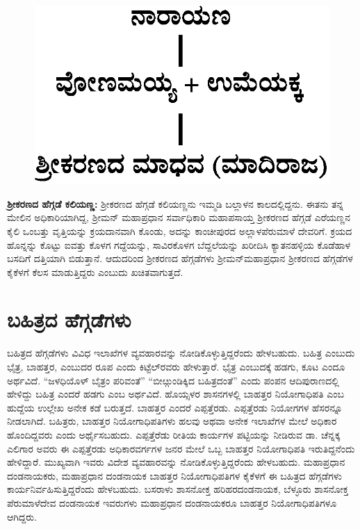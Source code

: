 \begin{figure}[H]
\includegraphics[scale=1.3]{images/chap3/chap3fig30.jpeg}
\end{figure}

\textbf{ಶ‍್ರೀಕರಣದ ಹೆಗ್ಗಡೆ ಕಲಿಯಣ್ಣ:} ಶ‍್ರೀಕರಣದ ಹೆಗ್ಗಡೆ ಕಲಿಯಣ್ಣನು ಇಮ್ಮಡಿ ಬಲ್ಲಾಳನ ಕಾಲದಲ್ಲಿದ್ದನು. ಈತನು ತನ್ನ ಮೇಲಿನ ಅಧಿಕಾರಿಯಾಗಿದ್ದ, ಶ‍್ರೀಮನ್​ ಮಹಾಪ್ರಧಾನ ಸರ್ವಾಧಿಕಾರಿ ಮಹಾಪಸಾಯ್ತ ಶ‍್ರೀಕರಣದ ಹೆಗ್ಗಡೆ ಎರೆಯಣ್ಣನ ಕೈಲಿ ಒಂಬತ್ತು ವೃತ್ತಿಯನ್ನು ಕ್ರಯದಾನವಾಗಿ ಕೊಂಡು, ಅದನ್ನು ಕಾಂಚೀಪುರದ ಅಲ್ಲಾಳಪೆರುಮಾಳೆ ದೇವರಿಗೆ. ಕ್ರಯದ ಹೊನ್ನನ್ನು ಕೊಟ್ಟು ಐವತ್ತು ಕೊಳಗ ಗದ್ದೆಯನ್ನು, ಸಾವಿರಕೊಳಗ ಬೆದ್ದಲೆಯನ್ನು ಖರೀದಿಸಿ ಕ್ಯಾತನಹಳ್ಳಿಯ ಕೊಡೆಹಾಳ ಬಸದಿಗೆ ದತ್ತಿಯಾಗಿ ಬಿಡುತ್ತಾನೆ. ಆದುದರಿಂದ ಶ‍್ರೀಕರಣದ ಹೆಗ್ಗಡೆಗಳು ಶ‍್ರೀಮನ್​ಮಹಾಪ್ರಧಾನ ಶ‍್ರೀಕರಣದ ಹೆಗ್ಗಡೆಗಳ ಕೈಕೆಳಗೆ ಕೆಲಸ ಮಾಡುತ್ತಿದ್ದರು ಎಂಬುದು ಖಚಿತವಾಗುತ್ತದೆ.


\section{ಬಹಿತ್ರದ ಹೆಗ್ಗಡೆಗಳು}

ಬಹಿತ್ರದ ಹೆಗ್ಗಡೆಗಳು ವಿವಿಧ ಇಲಾಖೆಗಳ ವ್ಯವಹಾರವನ್ನು ನೋಡಿಕೊಳ್ಳುತ್ತಿದ್ದರೆಂದು ಹೇಳಬಹುದು. ಬಹಿತ್ರ ಎಂಬುದು ಭೈತ್ರ, ಬಾಹತ್ತರ, ಎಂಬುದರ ರೂಪ ಎಂದು ಕಿಟ್ಟೆಲ್​ರವರು ಹೇಳುತ್ತಾರೆ. ಭೈತ್ರ ಎಂಬುದಕ್ಕೆ ಹಡಗು, ಕೂಟ ಎಂದೂ ಅರ್ಥವಿದೆ. “ಜಳಧಿಯೊಳ್​ ಬೈತ್ರಂ ಪರಿವಂತೆ” “ಬೀೞ್ಗುಂಡಿಕ್ಕಿದ ಬಹಿತ್ರದಂತೆ” ಎಂದು ಪಂಪನ ಆದಿಪುರಾಣದಲ್ಲಿ ಹೇಳಿದ್ದು ಬಹಿತ್ರ ಎಂದರೆ ಹಡಗು ಎಂಬ ಅರ್ಥವಿದೆ. ಹೊಯ್ಸಳರ ಶಾಸನಗಳಲ್ಲಿ ಬಾಹತ್ತರ ನಿಯೋಗಾಧಿಪತಿ ಎಂಬ ಹುದ್ದೆಯ ಉಲ್ಲೇಖ ಅನೇಕ ಕಡೆ ಬರುತ್ತದೆ. ಬಾಹತ್ತರ ಎಂದರೆ ಎಪ್ಪತ್ತೆರಡು. ಎಪ್ಪತ್ತೆರಡು ನಿಯೋಗಗಳ ಹೆಸರನ್ನೂ ನೀಡಲಾಗಿದೆ. ಬಹಿತ್ರರು, ಬಾಹತ್ತರ ನಿಯೋಗಾಧಿಪತಿಗಳು ಹಲವು ಅಥವಾ ಅನೇಕ ಇಲಾಖೆಗಳ ಮೇಲೆ ಅಧಿಕಾರ ಹೊಂದಿದ್ದವರು ಎಂದು ಅರ್ಥೈಸಬಹುದು. ಎಪ್ಪತ್ತೆರೆಡು ರೀತಿಯ ಕಾರ್ಯಗಳ ಪಟ್ಟಿಯನ್ನು ನೀಡಿರುವ ಡಾ. ಚೆನ್ನಕ್ಕ ಎಲಿಗಾರ ಅವರು ಈ ಎಪ್ಪತ್ತೆರಡು ಅಧಿಕಾರವರ್ಗಗಳ ಜನರ ಮೇಲೆ ಒಬ್ಬ ಬಾಹತ್ತರ ನಿಯೋಗಾಧಿಪತಿ ಇರುತಿದ್ದನೆಂದು ಹೇಳಿದ್ದಾರೆ. ಮುಖ್ಯವಾಗಿ ಇವರು ವಿದೇಶ ವ್ಯವಹಾರವನ್ನು ನೋಡಿಕೊಳ್ಳುತ್ತಿದ್ದರೆಂದು ಹೇಳಬಹುದು. ಮಹಾಪ್ರಧಾನ ದಂಡನಾಯಕರು, ಮಹಾಪ್ರಧಾನ ದಂಡನಾಯಕ ಬಾಹತ್ತರ ನಿಯೋಗಾಧಿಪತಿಗಳ ಕೈಕೆಳಗೆ ಈ ಬಹಿತ್ರದ ಹೆಗ್ಗಡೆಗಳು ಕಾರ್ಯನಿರ್ವಹಿಸುತ್ತಿದ್ದರೆಂದು ಹೇಳಬಹುದು. ಬಸರಾಳು ಶಾಸನೋಕ್ತ ಹರಿಹರದಂಡನಾಯಕ, ಬೆಳ್ಳೂರು ಶಾಸನೋಕ್ತ ಪೆರುಮಾಳೆದೇವ ದಂಡನಾಯಕ ಇವರುಗಳು ಮಹಾಪ್ರಧಾನ ದಂಡನಾಯಕರೂ ಬಾಹತ್ತರ ನಿಯೋಗಾಧಿಪತಿಗಳೂ ಆಗಿದ್ದರು.

